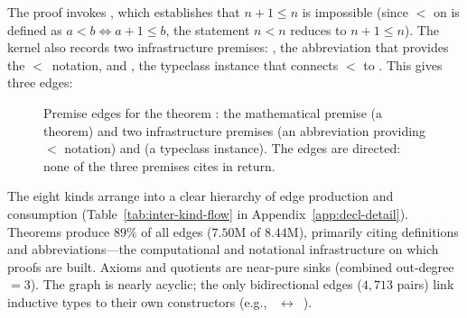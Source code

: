 \noindent
The proof invokes , which establishes that $n + 1 \le n$ is impossible (since $<$ on  is defined as $a < b \iff a + 1 \le b$, the statement $n < n$ reduces to $n + 1 \le n$). The kernel also records two infrastructure premises: , the abbreviation that provides the $<$~notation, and , the typeclass instance that connects $<$ to . This gives three edges:

\begin{figure}[H]
\centering
{}
\caption{Premise edges for the theorem : the mathematical premise  (a theorem) and two infrastructure premises  (an abbreviation providing $<$ notation) and  (a typeclass instance). The edges are directed: none of the three premises cites  in return.}
\label{fig:thm-single-edge}
\end{figure}

\noindent
The eight kinds arrange into a clear hierarchy of edge production and consumption (Table~\ref{tab:inter-kind-flow} in Appendix~\ref{app:decl-detail}). Theorems produce $89\%$ of all edges ($7.50$M of $8.44$M), primarily citing definitions and abbreviations---the computational and notational infrastructure on which proofs are built. Axioms and quotients are near-pure sinks (combined out-degree $= 3$). The graph is nearly acyclic; the only bidirectional edges ($4{,}713$ pairs) link inductive types to their own constructors (e.g., ~$\leftrightarrow$~).

